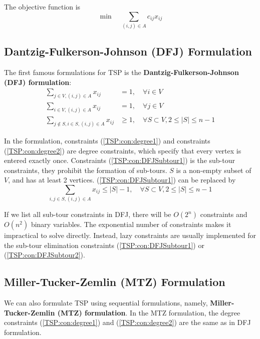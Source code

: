             The objective function is
            \begin{equation}
                \min \quad \sum_{(i, j)\in A} c_{ij}x_{ij}
            \end{equation}

            \subsection{Dantzig-Fulkerson-Johnson (DFJ) Formulation}
                The first famous formulations for TSP is the \textbf{Dantzig-Fulkerson-Johnson (DFJ) formulation}:
                \begin{align}
                    \sum_{j \in V, (i,j)\in A} x_{ij} & = 1, \quad \forall i \in V \label{TSP:con:degree1}\\
                    \sum_{i \in V, (i,j)\in A} x_{ij} & = 1, \quad \forall j \in V \label{TSP:con:degree2}\\
                    \sum_{j\notin S, i\in S, (i,j)\in A} x_{ij} & \ge 1, \quad \forall S \subset V, 2\le |S| \le n-1 \label{TSP:con:DFJSubtour1}
                \end{align}

                In the formulation, constraints (\ref{TSP:con:degree1}) and constraints (\ref{TSP:con:degree2}) are degree constraints, which specify that every vertex is entered exactly once. Constraints (\ref{TSP:con:DFJSubtour1}) is the sub-tour constraints, they prohibit the formation of sub-tours. $S$ is a non-empty subset of $V$, and has at least 2 vertices. (\ref{TSP:con:DFJSubtour1}) can be replaced by
                \begin{equation}
                    \sum_{i, j \in S, (i, j) \in A} x_{ij} \le |S| - 1, \quad \forall S \subset V, 2\le |S| \le n-1\label{TSP:con:DFJSubtour2}
                \end{equation}

                If we list all sub-tour constraints in DFJ, there will be $O(2^n)$ constraints and $O(n^2)$ binary variables. The exponential number of constraints makes it impractical to solve directly. Instead, lazy constraints are usually implemented for the sub-tour elimination constraints (\ref{TSP:con:DFJSubtour1}) or (\ref{TSP:con:DFJSubtour2}).

            \subsection{Miller-Tucker-Zemlin (MTZ) Formulation}
                We can also formulate TSP using sequential formulations, namely, \textbf{Miller-Tucker-Zemlin (MTZ) formulation}. In the MTZ formulation, the degree constraints (\ref{TSP:con:degree1}) and (\ref{TSP:con:degree2}) are the same as in DFJ formulation.

